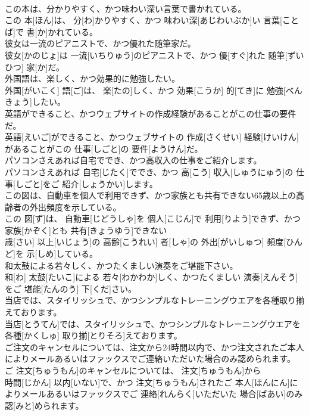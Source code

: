 \documentclass[8pt]{extreport}
\begin{document}
\begin{CJK}{UTF8}{min}
\\	この本は、分かりやすく、かつ味わい深い言葉で書かれている。	
\\	この 本[ほん]は、 分[わ]かりやすく、かつ 味わい深[あじわいぶか]い 言葉[ことば]で 書[か]かれている。
\\	彼女は一流のピアニストで、かつ優れた随筆家だ。	
\\	彼女[かのじょ]は 一流[いちりゅう]のピアニストで、かつ 優[すぐ]れた 随筆[ずいひつ] 家[か]だ。
\\	外国語は、楽しく、かつ効果的に勉強したい。	
\\	外国[がいこく] 語[ご]は、 楽[たの]しく、かつ 効果[こうか] 的[てき]に 勉強[べんきょう]したい。
\\	英語ができること、かつウェブサイトの作成経験があることがこの仕事の要件だ。	
\\	英語[えいご]ができること、かつウェブサイトの 作成[さくせい] 経験[けいけん]があることがこの 仕事[しごと]の 要件[ようけん]だ。
\\	パソコンさえあれば自宅ででき、かつ高収入の仕事をご紹介します。	
\\	パソコンさえあれば 自宅[じたく]ででき、かつ 高[こう] 収入[しゅうにゅう]の 仕事[しごと]をご 紹介[しょうかい]します。
\\	この図は、自動車を個人で利用できず、かつ家族とも共有できない65歳以上の高齢者の外出頻度を示している。	
\\	この 図[ず]は、 自動車[じどうしゃ]を 個人[こじん]で 利用[りよう]できず、かつ 家族[かぞく]とも 共有[きょうゆう]できない 
\\	歳[さい] 以上[いじょう]の 高齢[こうれい] 者[しゃ]の 外出[がいしゅつ] 頻度[ひんど]を 示[しめ]している。
\\	和太鼓による若々しく、かつたくましい演奏をご堪能下さい。	
\\	和[わ] 太鼓[たいこ]による 若々[わかわか]しく、かつたくましい 演奏[えんそう]をご 堪能[たんのう] 下[くだ]さい。
\\	当店では、スタイリッシュで、かつシンプルなトレーニングウエアを各種取り揃えております。	
\\	当店[とうてん]では、スタイリッシュで、かつシンプルなトレーニングウエアを 各種[かくしゅ] 取り揃[とりそろ]えております。
\\	ご注文のキャンセルについては、注文から24時間以内で、かつ注文されたご本人によりメールあるいはファックスでご連絡いただいた場合のみ認められます。	
\\	ご 注文[ちゅうもん]のキャンセルについては、 注文[ちゅうもん]から 
\\	時間[じかん] 以内[いない]で、かつ 注文[ちゅうもん]されたご 本人[ほんにん]によりメールあるいはファックスでご 連絡[れんらく]いただいた 場合[ばあい]のみ 認[みと]められます。

\end{CJK}
\end{document}
